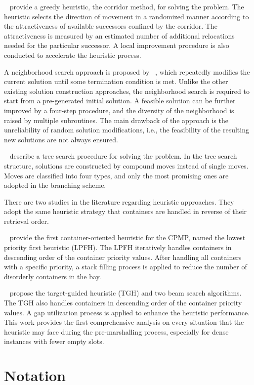 \documentclass[review,3p,times,12pt,number]{elsarticle}\usepackage{amsmath}\usepackage{amssymb}
\renewcommand{\citet}[1]{\citeauthor{#1}~\citep{#1}}
\begin{document}
\citet{cas2009} provide a greedy heuristic, the corridor method, for solving the problem. The heuristic selects the direction of movement in a randomized manner according to the attractiveness of available successors confined by the corridor. The attractiveness is measured by an estimated number of additional relocations needed for the particular successor.
A local improvement procedure is also conducted to accelerate the heuristic process.

A neighborhood search approach is proposed by \citet{lee2009}, which repeatedly modifies the current solution until some termination condition is met. Unlike the other existing solution construction approaches, the neighborhood search  is required to start from a pre-generated initial solution. 
A feasible solution can be further improved by a four-step procedure, and the diversity of the neighborhood is raised by multiple subroutines. The main drawback of the approach is the unreliability of random solution modifications, i.e., the feasibility of the resulting new solutions are not always ensured.

\citet{bort2012} describe a tree search procedure for solving the problem.
In the tree search structure, solutions are constructed by compound moves  instead of single moves. Moves are classified into four types, and only the most promising ones are adopted in the branching scheme.

There are two studies in the literature regarding heuristic approaches. They adopt the same heuristic strategy that containers are handled in reverse of their retrieval order.

\citet{exp2012} provide the first container-oriented heuristic for the CPMP, named the lowest priority first heuristic (LPFH). The LPFH iteratively handles containers in descending order of the container priority values. After handling all containers with a specific priority, a stack filling process is applied to reduce the number of disorderly containers in the bay.

\citet{wang2015} propose the target-guided heuristic (TGH) and two beam search algorithms. The TGH also handles containers in descending order of the container priority values. A gap utilization process is applied to enhance the heuristic performance. This work provides the first comprehensive analysis on every situation that the heuristic may face during the pre-marshalling process, especially for dense instances with fewer empty slots.

\section{Notation}
\label{sec:notation}
\end{document}
